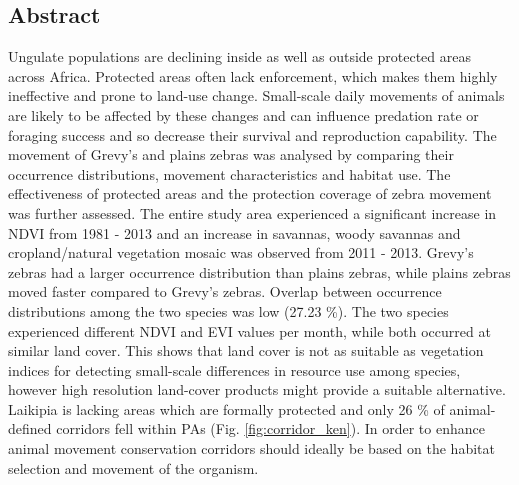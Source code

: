 \documentclass[12pt,a4paper, twoside, english]{article}
\begin{document}
\subsection{Abstract}


Ungulate populations are declining inside as well as outside protected areas across Africa. Protected areas often lack enforcement, which makes them highly ineffective and prone to land-use change. Small-scale daily movements of animals are likely to be affected by these changes and can influence predation rate or foraging success and so decrease their survival and reproduction capability. The movement of Grevy's and plains zebras was analysed by comparing their occurrence distributions, movement characteristics and habitat use. The effectiveness of protected areas and the protection coverage of zebra movement was further assessed. The entire study area experienced a significant increase in NDVI from 1981 - 2013 and an increase in savannas, woody savannas and cropland/natural vegetation mosaic was observed from 2011 - 2013. Grevy's zebras had a larger occurrence distribution than plains zebras, while plains zebras moved faster compared to Grevy's zebras. Overlap between occurrence distributions among the two species was low (27.23 \%). The two species experienced different NDVI and EVI values per month, while both occurred at similar land cover. This shows that land cover is not as suitable as vegetation indices for detecting small-scale differences in resource use among species, however high resolution land-cover products might provide a suitable alternative. Laikipia is lacking areas which are formally protected and only 26 \% of animal-defined corridors fell within PAs (Fig. \ref{fig:corridor_ken}). In order to enhance animal movement conservation  corridors should ideally be based on the habitat selection and movement of the organism. \\
\end{document}
